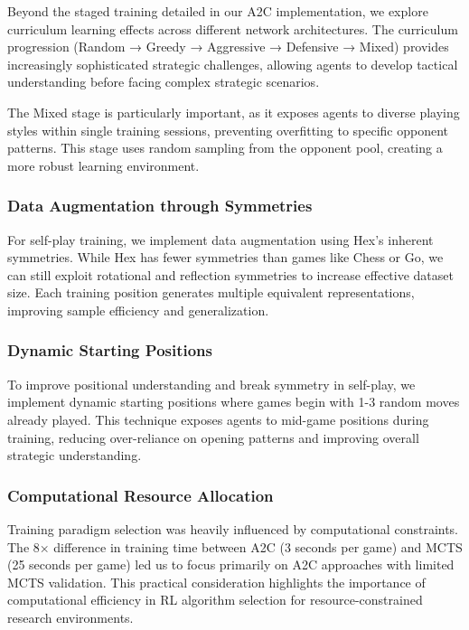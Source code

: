 \documentclass[conference]{IEEEtran}
\begin{document}
Beyond the staged training detailed in our A2C implementation, we explore curriculum learning effects across different network architectures. The curriculum progression (Random → Greedy → Aggressive → Defensive → Mixed) provides increasingly sophisticated strategic challenges, allowing agents to develop tactical understanding before facing complex strategic scenarios.

The Mixed stage is particularly important, as it exposes agents to diverse playing styles within single training sessions, preventing overfitting to specific opponent patterns. This stage uses random sampling from the opponent pool, creating a more robust learning environment.

\subsubsection{Data Augmentation through Symmetries}

For self-play training, we implement data augmentation using Hex's inherent symmetries. While Hex has fewer symmetries than games like Chess or Go, we can still exploit rotational and reflection symmetries to increase effective dataset size. Each training position generates multiple equivalent representations, improving sample efficiency and generalization.

\subsubsection{Dynamic Starting Positions}

To improve positional understanding and break symmetry in self-play, we implement dynamic starting positions where games begin with 1-3 random moves already played. This technique exposes agents to mid-game positions during training, reducing over-reliance on opening patterns and improving overall strategic understanding.

\subsubsection{Computational Resource Allocation}

Training paradigm selection was heavily influenced by computational constraints. The 8× difference in training time between A2C (3 seconds per game) and MCTS (25 seconds per game) led us to focus primarily on A2C approaches with limited MCTS validation. This practical consideration highlights the importance of computational efficiency in RL algorithm selection for resource-constrained research environments.
\end{document}
